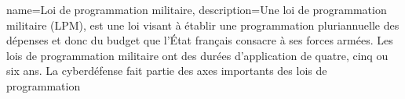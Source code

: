 %
%


{
name={Loi de programmation militaire},
description={Une loi de programmation militaire (LPM), est une loi visant à établir une programmation pluriannuelle des dépenses et donc du budget que l'État français consacre à ses forces armées. Les lois de programmation militaire ont des durées d'application de quatre, cinq ou six ans. La cyberdéfense fait partie des axes importants des lois de programmation}
}



